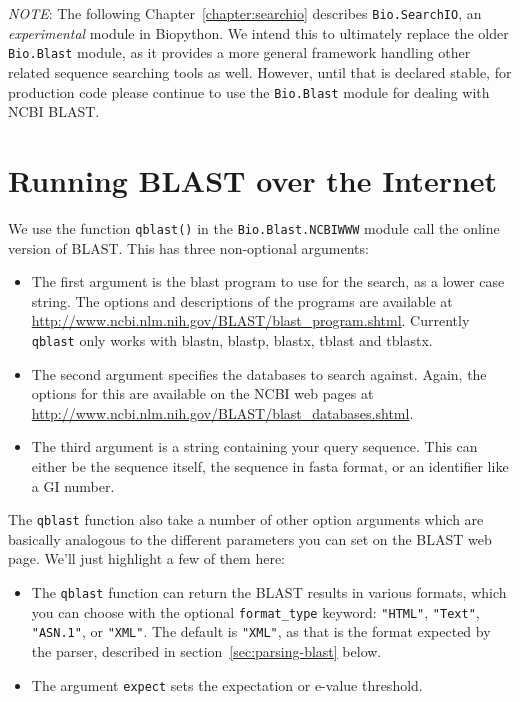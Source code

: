 \documentclass{report}
\begin{document}
\emph{NOTE}: The following Chapter~\ref{chapter:searchio} describes
\verb|Bio.SearchIO|, an \emph{experimental} module in Biopython. We
intend this to ultimately replace the older \verb|Bio.Blast| module, as it
provides a more general framework handling other related sequence
searching tools as well. However, until that is declared stable, for
production code please continue to use the  \verb|Bio.Blast| module
for dealing with NCBI BLAST.

\section{Running BLAST over the Internet}
\label{sec:running-www-blast}

We use the function \verb|qblast()| in the \verb|Bio.Blast.NCBIWWW| module
call the online version of BLAST.  This has three non-optional arguments:
\begin{itemize}
\item The first argument is the blast program to use for the search, as a
lower case string. The options and descriptions of the programs are
available at \url{http://www.ncbi.nlm.nih.gov/BLAST/blast_program.shtml}.
Currently \verb|qblast| only works with blastn, blastp, blastx, tblast
and tblastx.
\item The second argument specifies the databases to search against. Again,
the options for this are available on the NCBI web pages at
\url{http://www.ncbi.nlm.nih.gov/BLAST/blast_databases.shtml}.
\item The third argument is a string containing your query sequence.  This
can either be the sequence itself, the sequence in fasta format,
or an identifier like a GI number.
\end{itemize}

The \verb|qblast| function also take a number of other option arguments
which are basically analogous to the different parameters you can set
on the BLAST web page.  We'll just highlight a few of them here:

\begin{itemize}
\item The \verb|qblast| function can return the BLAST results in various
formats, which you can choose with the optional \verb|format_type| keyword:
\verb|"HTML"|, \verb|"Text"|, \verb|"ASN.1"|, or \verb|"XML"|.
The default is \verb|"XML"|, as that is the format expected by the parser,
described in section~\ref{sec:parsing-blast} below.
\item The argument \verb|expect| sets the expectation or e-value threshold.
\end{itemize}
\end{document}
